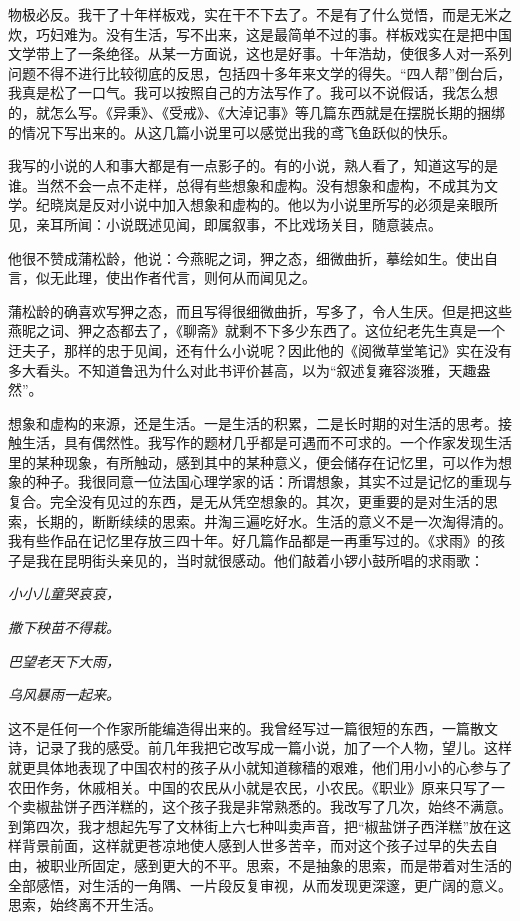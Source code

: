 \documentclass[12pt,a5paper]{ctexbook}
\begin{document}
物极必反。我干了十年样板戏，实在干不下去了。不是有了什么觉悟，而是无米之炊，巧妇难为。没有生活，写不出来，这是最简单不过的事。样板戏实在是把中国文学带上了一条绝径。从某一方面说，这也是好事。十年浩劫，使很多人对一系列问题不得不进行比较彻底的反思，包括四十多年来文学的得失。“四人帮”倒台后，我真是松了一口气。我可以按照自己的方法写作了。我可以不说假话，我怎么想的，就怎么写。《异秉》、《受戒》、《大淖记事》等几篇东西就是在摆脱长期的捆绑的情况下写出来的。从这几篇小说里可以感觉出我的鸢飞鱼跃似的快乐。

我写的小说的人和事大都是有一点影子的。有的小说，熟人看了，知道这写的是谁。当然不会一点不走样，总得有些想象和虚构。没有想象和虚构，不成其为文学。纪晓岚是反对小说中加入想象和虚构的。他以为小说里所写的必须是亲眼所见，亲耳所闻：小说既述见闻，即属叙事，不比戏场关目，随意装点。

他很不赞成蒲松龄，他说：今燕昵之词，狎之态，细微曲折，摹绘如生。使出自言，似无此理，使出作者代言，则何从而闻见之。

蒲松龄的确喜欢写狎之态，而且写得很细微曲折，写多了，令人生厌。但是把这些燕昵之词、狎之态都去了，《聊斋》就剩不下多少东西了。这位纪老先生真是一个迂夫子，那样的忠于见闻，还有什么小说呢？因此他的《阅微草堂笔记》实在没有多大看头。不知道鲁迅为什么对此书评价甚高，以为“叙述复雍容淡雅，天趣盎然”。

想象和虚构的来源，还是生活。一是生活的积累，二是长时期的对生活的思考。接触生活，具有偶然性。我写作的题材几乎都是可遇而不可求的。一个作家发现生活里的某种现象，有所触动，感到其中的某种意义，便会储存在记忆里，可以作为想象的种子。我很同意一位法国心理学家的话：所谓想象，其实不过是记忆的重现与复合。完全没有见过的东西，是无从凭空想象的。其次，更重要的是对生活的思索，长期的，断断续续的思索。井淘三遍吃好水。生活的意义不是一次淘得清的。我有些作品在记忆里存放三四十年。好几篇作品都是一再重写过的。《求雨》的孩子是我在昆明街头亲见的，当时就很感动。他们敲着小锣小鼓所唱的求雨歌：

\centerline{\emph{小小儿童哭哀哀，}}
\centerline{\emph{撒下秧苗不得栽。}}
\centerline{\emph{巴望老天下大雨，}}
\centerline{\emph{乌风暴雨一起来。}}

这不是任何一个作家所能编造得出来的。我曾经写过一篇很短的东西，一篇散文诗，记录了我的感受。前几年我把它改写成一篇小说，加了一个人物，望儿。这样就更具体地表现了中国农村的孩子从小就知道稼穑的艰难，他们用小小的心参与了农田作务，休戚相关。中国的农民从小就是农民，小农民。《职业》原来只写了一个卖椒盐饼子西洋糕的，这个孩子我是非常熟悉的。我改写了几次，始终不满意。到第四次，我才想起先写了文林街上六七种叫卖声音，把“椒盐饼子西洋糕”放在这样背景前面，这样就更苍凉地使人感到人世多苦辛，而对这个孩子过早的失去自由，被职业所固定，感到更大的不平。思索，不是抽象的思索，而是带着对生活的全部感悟，对生活的一角隅、一片段反复审视，从而发现更深邃，更广阔的意义。思索，始终离不开生活。
\end{document}
